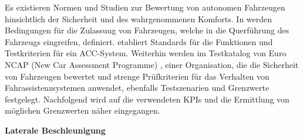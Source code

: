 Es existieren Normen und Studien zur Bewertung von autonomen Fahrzeugen hinsichtlich der Sicherheit und des wahrgenommenen Komforts. In \cite{UNECE_R79} werden Bedingungen für die Zulassung von Fahrzeugen, welche in die Querführung des Fahrzeugs eingreifen, definiert. \cite{ISO15622} etabliert Standards für die Funktionen und Testkriterien für ein ACC-System. Weiterhin werden im Testkatalog von Euro NCAP (New Car Assessment Programme) \cite{NCAP2024}, einer Organisation, die die Sicherheit von Fahrzeugen bewertet und strenge Prüfkriterien für das Verhalten von Fahrassistenzsystemen anwendet, ebenfalls Testszenarien und Grenzwerte festgelegt. Nachfolgend wird auf die verwendeten KPIs und die Ermittlung von möglichen Grenzwerten näher eingegangen.

\bigskip\noindent\textbf{Laterale Beschleunigung}

